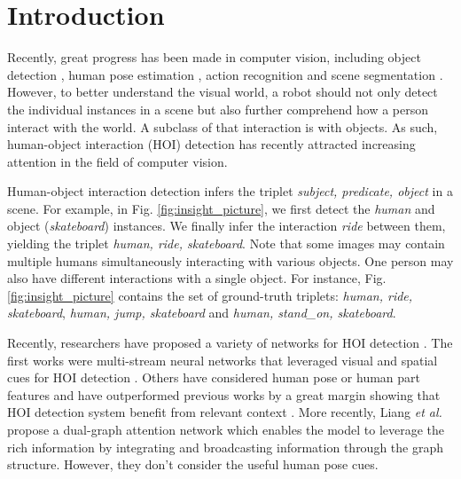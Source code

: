 \documentclass[10pt,twocolumn,letterpaper]{article}
\newcommand{\et}{{\em et al.\ }}
\begin{document}
\section{Introduction}\label{sec:intro}
Recently, great progress has been made in computer vision, including object detection \cite{renNIPS15fasterrcnn,liu2016ssd,dai2016r,girshick2015fast}, human pose estimation \cite{Dabral2018LearningMotion,pavllo20193d,liu2020gastnet,Zhao_2019}, action recognition \cite{Yan2018SpatialRecognition,Li2019Actional-StructuralRecognition} and scene segmentation \cite{he2017mask}. However, to better understand the visual world, a robot should not only detect the individual instances in a scene but also further comprehend how a person interact with the world. A subclass of that interaction is with objects. As such, human-object interaction (HOI) detection
has recently attracted increasing attention in the field of computer vision.

Human-object interaction detection infers the triplet \textit{subject, predicate, object} in a scene. For example, in Fig. \ref{fig:insight_picture}, we first detect the \textit{human} and object (\textit{skateboard}) instances. We finally infer the interaction \textit{ride} between them, yielding the triplet \textit{human, ride, skateboard}. Note that some images may contain multiple humans simultaneously interacting with various objects. One person may also have different interactions with a single object. For instance, Fig. \ref{fig:insight_picture} contains the set of ground-truth triplets: \textit{human, ride, skateboard}, \textit{human, jump, skateboard} and \textit{human, stand\_on, skateboard}.


Recently, researchers have proposed a variety of networks for HOI detection \cite{chao2018learning, gkioxari2018detecting, gao2018ican,gupta2018nofrills,Li_2019_CVPR,liang2020visualsemantic}. The first works were multi-stream neural networks that leveraged visual and spatial cues for HOI detection \cite{chao2018learning, gkioxari2018detecting, gao2018ican}.  Others have considered human pose or human part features and have outperformed previous works by a great margin showing that HOI detection system benefit from relevant context \cite{gupta2018nofrills, Li_2019_CVPR, wan2019pose}. More recently, Liang \et \cite{liang2020visualsemantic} propose a dual-graph attention network which enables the model to leverage the rich information by integrating and broadcasting information through the graph structure. However, they don't consider the useful human pose cues. 
\end{document}
